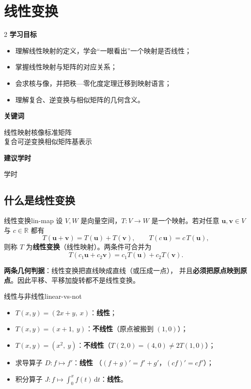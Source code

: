 \documentclass[11pt,a4paper,openany]{ctexbook}
\newcommand{\R}{\mathbb{R}}
\begin{document}
\chapter{线性变换}
\label{ch:trans}

\begin{chapoutline}
\small
\begin{multicols}{2}
\textbf{学习目标}
\begin{itemize}[leftmargin=1.5em, itemsep=1.5pt]
\item 理解线性映射的定义，学会“一眼看出”一个映射是否线性；
\item 掌握线性映射与矩阵的对应关系；
\item 会求核与像，并把秩—零化度定理迁移到映射语言；
\item 理解复合、逆变换与相似矩阵的几何含义。
\end{itemize}
\columnbreak
\textbf{关键词}
\par\smallskip
线性映射\quad 核\quad 像\quad 标准矩阵\\
复合\quad 可逆变换\quad 相似矩阵\quad 基表示
\par\smallskip
\textbf{建议学时}
\par{} 学时
\end{multicols}
\end{chapoutline}

\section{什么是线性变换}

\begin{defn}{线性变换}{lin-map}
设 $V,W$ 是向量空间，$T:V\to W$ 是一个映射。若对任意
$\boldsymbol{u},\boldsymbol{v}\in V$ 与 $c\in\R$ 都有
\[
T(\boldsymbol{u}+\boldsymbol{v})=T(\boldsymbol{u})+T(\boldsymbol{v}),
\qquad
T(c\,\boldsymbol{u})=c\,T(\boldsymbol{u}),
\]
则称 $T$ 为\textbf{线性变换}（线性映射）。两条件可合并为
\[
T(c_1\boldsymbol{u}+c_2\boldsymbol{v})
=c_1T(\boldsymbol{u})+c_2T(\boldsymbol{v}).
\]
\end{defn}

\begin{keypoint}
\textbf{两条几何判据}：线性变换把直线映成直线（或压成一点），
并且\textbf{必须把原点映到原点}。因此平移、平移加旋转都不是线性变换。
\end{keypoint}

\begin{exmp}{线性与非线性}{linear-vs-not}
\begin{itemize}[itemsep=1pt]
\item $T(x,y)=(2x+y,\ x)$：\textbf{线性}；
\item $T(x,y)=(x+1,\ y)$：\textbf{不线性}（原点被搬到 $(1,0)$）；
\item $T(x,y)=(x^2,\ y)$：\textbf{不线性}（$T(2,0)=(4,0)\neq 2T(1,0)$）；
\item 求导算子 $D:f\mapsto f'$：\textbf{线性}
      （$(f+g)'=f'+g'$，$(cf)'=cf'$）；
\item 积分算子 $J:f\mapsto\int_0^x f(t)\,\mathrm{d}t$：\textbf{线性}。
\end{itemize}
\end{exmp}
\end{document}
